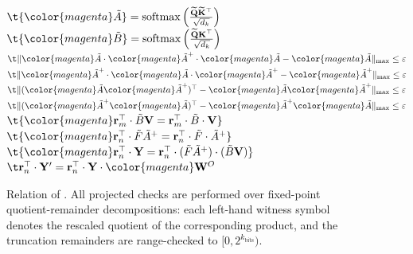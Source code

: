 \documentclass[sigconf,anonymous,review,balance=false]{acmart}
\newcommand{\rev}[1]{{\color{magenta}#1}}
\begin{document}
\begin{figure}[t!]
{{        $\t \rev{\tilde{A}} = \sfmax\left( \frac{\widetilde{\Q}\widetilde{\K}^\top}{\sqrt{d_k}} \right)$ \\
        $\t \rev{\tilde{B}} = \sfmax\left( \frac{\widetilde{\Q}\K^\top}{\sqrt{d_k}} \right)$ \\
        $\t \lVert \rev{\tilde{A}} \cdot \rev{\tilde{A}}^+ \cdot \rev{\tilde{A}} - \rev{\tilde{A}} \rVert_{\max} \leq \varepsilon$ \\
        $\t \lVert \rev{\tilde{A}}^+ \cdot \rev{\tilde{A}} \cdot \rev{\tilde{A}}^+ - \rev{\tilde{A}}^+ \rVert_{\max} \leq \varepsilon$ \\
        $\t \lVert (\rev{\tilde{A}}\rev{\tilde{A}}^+)^\top - \rev{\tilde{A}}\rev{\tilde{A}}^+ \rVert_{\max} \leq \varepsilon$ \\
        $\t \lVert (\rev{\tilde{A}}^+\rev{\tilde{A}})^\top - \rev{\tilde{A}}^+\rev{\tilde{A}} \rVert_{\max} \leq \varepsilon$ \\
        $\t \rev{\rand_m^\top \cdot \tilde{B}\V = \rand_m^\top \cdot \tilde{B} \cdot \V}$ \\
        $\t \rev{\rand_n^\top \cdot \tilde{F}\tilde{A}^{+} = \rand_n^\top \cdot \tilde{F} \cdot \tilde{A}^+}$ \\
        $\t \rev{\rand_n^\top \cdot \Y = \rand_n^\top \cdot (\tilde{F}\tilde{A}^{+}) \cdot (\tilde{B}\V)}$ \\
        $\t \rand_n^\top \cdot \Y' = \rand_n^\top \cdot \Y \cdot \rev{\W^O}$
}}
\caption{Relation of \name. \rev{All projected checks are performed over fixed-point quotient-remainder decompositions: each left-hand witness symbol denotes the rescaled quotient of the corresponding product, and the truncation remainders are range-checked to $[0, 2^{k_{\text{bits}}})$.}}
\label{fig:relation}
\end{figure}
\end{document}
